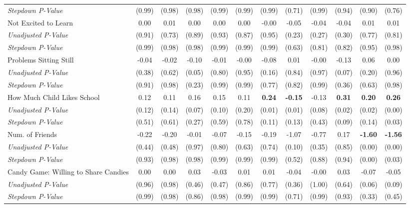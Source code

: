 \begin{tabular}{l c c c c c c c c c c c}
\quad \textit{Stepdown P-Value} & (0.99) & (0.98) & (0.98) & (0.99) & (0.99) & (0.99) & (0.71) & (0.99) & (0.94) & (0.90) & (0.76) \\
Not Excited to Learn & 0.00 & 0.01 & 0.00 & 0.00 & 0.00 & -0.00 & -0.05 & -0.04 & -0.04 & 0.01 & 0.01 \\
\quad \textit{Unadjusted P-Value} & (0.91) & (0.73) & (0.89) & (0.93) & (0.87) & (0.95) & (0.23) & (0.27) & (0.30) & (0.77) & (0.81) \\
\quad \textit{Stepdown P-Value} & (0.99) & (0.98) & (0.98) & (0.99) & (0.99) & (0.99) & (0.63) & (0.81) & (0.82) & (0.95) & (0.98) \\
Problems Sitting Still & -0.04 & -0.02 & -0.10 & -0.01 & -0.00 & -0.08 & 0.01 & -0.00 & -0.13 & 0.06 & 0.00 \\
\quad \textit{Unadjusted P-Value} & (0.38) & (0.62) & (0.05) & (0.80) & (0.95) & (0.16) & (0.84) & (0.97) & (0.07) & (0.20) & (0.96) \\
\quad \textit{Stepdown P-Value} & (0.91) & (0.98) & (0.23) & (0.99) & (0.99) & (0.77) & (0.82) & (0.99) & (0.36) & (0.63) & (0.98) \\
How Much Child Likes School & 0.12 & 0.11 & 0.16 & 0.15 & 0.11 & \textbf{ 0.24 } & \textbf{ -0.15 } & -0.13 & \textbf{ 0.31 } & \textbf{ 0.20 } & \textbf{ 0.26 } \\
\quad \textit{Unadjusted P-Value} & (0.12) & (0.14) & (0.07) & (0.10) & (0.20) & (0.01) & (0.01) & (0.08) & (0.02) & (0.02) & (0.00) \\
\quad \textit{Stepdown P-Value} & (0.51) & (0.61) & (0.27) & (0.59) & (0.78) & (0.11) & (0.13) & (0.43) & (0.09) & (0.14) & (0.03) \\
Num. of Friends & -0.22 & -0.20 & -0.01 & -0.07 & -0.15 & -0.19 & -1.07 & -0.77 & 0.17 & \textbf{ -1.60 } & \textbf{ -1.56 } \\
\quad \textit{Unadjusted P-Value} & (0.44) & (0.48) & (0.97) & (0.80) & (0.63) & (0.74) & (0.10) & (0.35) & (0.85) & (0.00) & (0.00) \\
\quad \textit{Stepdown P-Value} & (0.93) & (0.98) & (0.98) & (0.99) & (0.99) & (0.99) & (0.52) & (0.88) & (0.94) & (0.00) & (0.03) \\
Candy Game: Willing to Share Candies & 0.00 & 0.00 & 0.03 & -0.03 & 0.01 & 0.01 & -0.04 & -0.00 & 0.03 & -0.07 & -0.05 \\
\quad \textit{Unadjusted P-Value} & (0.96) & (0.98) & (0.46) & (0.47) & (0.86) & (0.77) & (0.36) & (1.00) & (0.64) & (0.06) & (0.09) \\
\quad \textit{Stepdown P-Value} & (0.99) & (0.98) & (0.86) & (0.98) & (0.99) & (0.99) & (0.71) & (0.99) & (0.93) & (0.33) & (0.45) \\
\bottomrule
\end{tabular}
